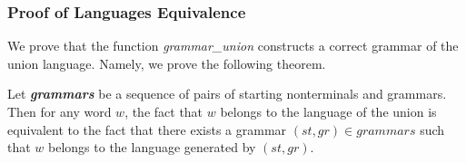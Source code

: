 


\subsubsection{Proof of Languages Equivalence}

We prove that the function \textit{grammar\_union} constructs a correct grammar of the union language. Namely, we prove the following theorem.

\begin{theorem} \label{theorem-correct-union}
    Let \textbf{\textit{grammars}} be a sequence of pairs of starting nonterminals and grammars. Then for any word $w$, the fact that $w$ belongs to the language of the union is equivalent to the fact that there exists a grammar $(st,gr) \in \textit{grammars}$ such that $w$ belongs to the language generated by $(st,gr)$.
\end{theorem}




